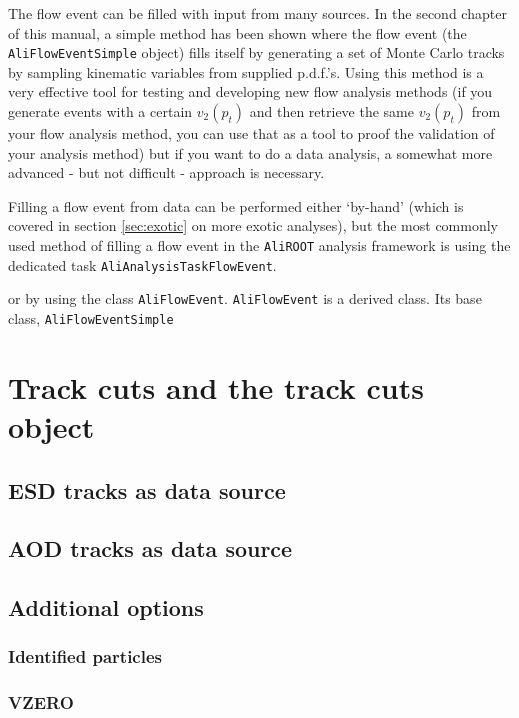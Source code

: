 \documentclass[a4paper]{book}
\numberwithin{equation}{subsection}
\begin{document}
The flow event can be filled with input from many sources. In the second chapter of this manual, a simple method has been shown where the flow event (the \texttt{AliFlowEventSimple} object) fills itself by generating a set of Monte Carlo tracks by sampling kinematic variables from supplied p.d.f.'s. Using this method is a very effective tool for testing and developing new flow analysis methods (if you generate events with a certain $v_2(p_t)$ and then retrieve the same $v_2(p_t)$ from your flow analysis method, you can use that as a tool to proof the validation of your analysis method) but if you want to do a data analysis, a somewhat more advanced - but not difficult - approach is necessary. 

Filling a flow event from data can be performed either `by-hand' (which is covered in section \ref{sec:exotic} on more exotic analyses), but the most commonly used method of filling a flow event in the \texttt{AliROOT} analysis framework is using the dedicated task \texttt{AliAnalysisTaskFlowEvent}. 



or by using the class \texttt{AliFlowEvent}. \texttt{AliFlowEvent} is a derived class. Its  base class, \texttt{AliFlowEventSimple} 


\section{Track cuts and the track cuts object}
\subsection{ESD tracks as data source}
\subsection{AOD tracks as data source}
\subsection{Additional options}
\subsubsection{Identified particles}
\subsubsection{VZERO}
\end{document}
